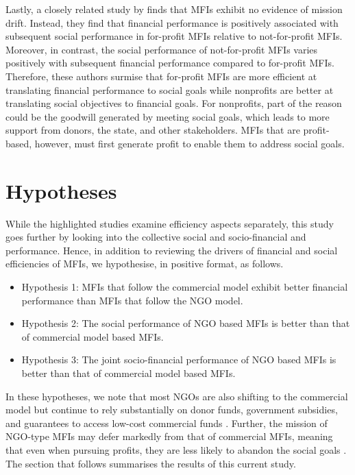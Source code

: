 \documentclass[a4paper, nobind]{templates/ociamthesis}
\providecommand{\tightlist}{%
  \setlength{\itemsep}{0pt}\setlength{\parskip}{0pt}}
\begin{document}
Lastly, a closely related study by \textcite{lam2020reciprocity} finds that MFIs exhibit no evidence of mission drift. Instead, they find that financial performance is positively associated with subsequent social performance in for-profit MFIs relative to not-for-profit MFIs. Moreover, in contrast, the social performance of not-for-profit MFIs varies positively with subsequent financial performance compared to for-profit MFIs. Therefore, these authors surmise that for-profit MFIs are more efficient at translating financial performance to social goals while nonprofits are better at translating social objectives to financial goals. For nonprofits, part of the reason could be the goodwill generated by meeting social goals, which leads to more support from donors, the state, and other stakeholders. MFIs that are profit-based, however, must first generate profit to enable them to address social goals.

\hypertarget{hypotheses}{%
\section{Hypotheses}\label{hypotheses}}

While the highlighted studies examine efficiency aspects separately, this study goes further by looking into the collective social and socio-financial and performance. Hence, in addition to reviewing the drivers of financial and social efficiencies of MFIs, we hypothesise, in positive format, as follows.

\begin{itemize}
\tightlist
\item
  Hypothesis 1: MFIs that follow the commercial model exhibit better financial performance than MFIs that follow the NGO model.
\item
  Hypothesis 2: The social performance of NGO based MFIs is better than that of commercial model based MFIs.
\item
  Hypothesis 3: The joint socio-financial performance of NGO based MFIs is better than that of commercial model based MFIs.
\end{itemize}

In these hypotheses, we note that most NGOs are also shifting to the commercial model but continue to rely substantially on donor funds, government subsidies, and guarantees to access low-cost commercial funds \autocite{d2013unsubsidized}. Further, the mission of NGO-type MFIs may defer markedly from that of commercial MFIs, meaning that even when pursuing profits, they are less likely to abandon the social goals \autocites{louis2013profit}[@][]{mersland2019social}. The section that follows summarises the results of this current study.
\end{document}

